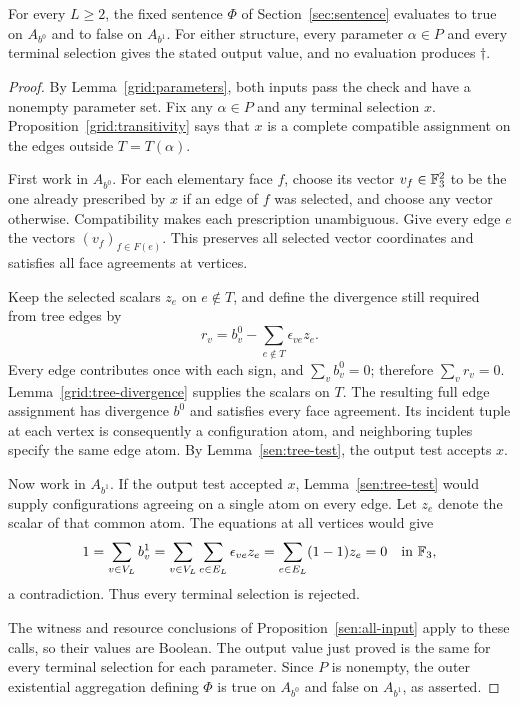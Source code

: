 \begin{theorem}\label{grid:separation}
For every $L\ge2$, the fixed sentence $\Phi$ of
Section~\ref{sec:sentence} evaluates to true on $A_{b^0}$ and to false
on $A_{b^1}$.  For either structure, every parameter $\alpha\in P$
and every terminal selection gives the stated output value, and no
evaluation produces $\dagger$.
\end{theorem}
\begin{proof}
By Lemma~\ref{grid:parameters}, both inputs pass the check and have a
nonempty parameter set.  Fix any $\alpha\in P$ and any terminal
selection $x$.  Proposition~\ref{grid:transitivity} says that $x$ is a
complete compatible assignment on the edges outside $T=T(\alpha)$.

First work in $A_{b^0}$.  For each elementary face $f$, choose its
vector $v_f\in\mathbb F_3^2$ to be the one already prescribed by $x$ if an
edge of $f$ was selected, and choose any vector otherwise.
Compatibility makes each prescription unambiguous.  Give every edge
$e$ the vectors $(v_f)_{f\in F(e)}$.  This preserves all selected
vector coordinates and satisfies all face agreements at vertices.

Keep the selected scalars $z_e$ on $e\notin T$, and define the
divergence still required from tree edges by
\[
 r_v=b^0_v-\sum_{e\notin T}\epsilon_{ve}z_e.
\]
Every edge contributes once with each sign, and $\sum_v b^0_v=0$;
therefore $\sum_v r_v=0$.  Lemma~\ref{grid:tree-divergence} supplies
the scalars on $T$.  The resulting full edge assignment has divergence
$b^0$ and satisfies every face agreement.  Its incident tuple at each
vertex is consequently a configuration atom, and neighboring tuples
specify the same edge atom.  By Lemma~\ref{sen:tree-test}, the output
test accepts $x$.

Now work in $A_{b^1}$.  If the output test accepted $x$,
Lemma~\ref{sen:tree-test} would supply configurations agreeing on a
single atom on every edge.  Let $z_e$ denote the scalar of that common
atom.  The equations at all vertices would give
\[
 1=\sum_{v\in V_L}b^1_v
   =\sum_{v\in V_L}\sum_{e\in E_L}\epsilon_{ve}z_e
   =\sum_{e\in E_L}(1-1)z_e=0
 \quad\text{in }\mathbb F_3,
\]
a contradiction.  Thus every terminal selection is rejected.

The witness and resource conclusions of
Proposition~\ref{sen:all-input} apply to these calls, so their values are
Boolean.  The output value just proved is the same for every terminal
selection for each parameter.  Since $P$ is nonempty, the outer
existential aggregation defining $\Phi$ is true on $A_{b^0}$ and false
on $A_{b^1}$, as asserted.
\end{proof}
